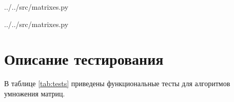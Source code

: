 \noindent
\begin{minipage}{\linewidth}
\begin{lstinputlisting}[
    caption={Реализация подпрограммы оптимизированного алгоритма Винограда для
    расчета значений массива mulH},
	label={lst:optWinMulV},
    linerange={98-108}
]{../../src/matrixes.py}
\end{lstinputlisting}
\end{minipage}

\noindent
\begin{minipage}{\linewidth}
\begin{lstinputlisting}[
	caption={Реализация оптимизированного алгоритма Винограда},
	label={lst:optWinograd},
    linerange={111-134}
]{../../src/matrixes.py}
\end{lstinputlisting}
\end{minipage}

\section{Описание тестирования}

В таблице \ref{tab:tests} приведены функциональные тесты для алгоритмов
умножения матриц.


